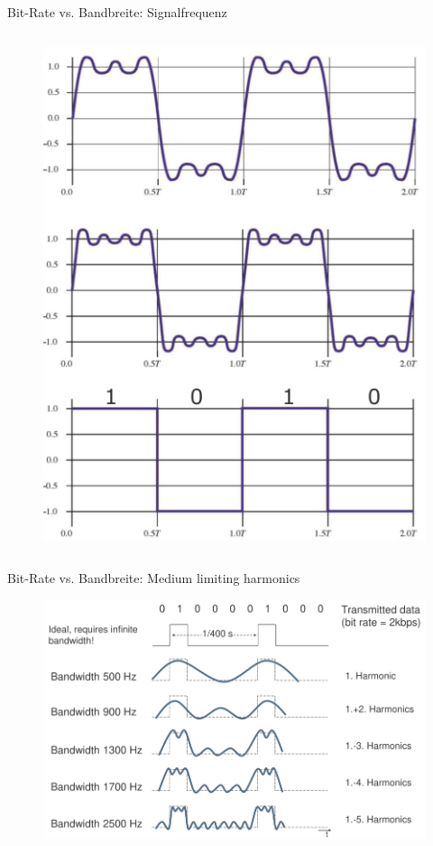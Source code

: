 \documentclass[xcolor=dvipsnames,aspectratio=169]{beamer}
\begin{document}
\begin{frame}{Bit-Rate vs. Bandbreite: Signalfrequenz}
\begin{columns}[T]
\begin{column}{.4\textwidth}
\begin{figure}
\includegraphics[scale=0.25]{sf}
\end{figure}
\end{column}%
\end{columns}
\end{frame}

\begin{frame}{Bit-Rate vs. Bandbreite: Medium limiting harmonics}
\begin{figure}
\includegraphics[scale=0.25]{harmonics}
\end{figure}
\end{frame}
\end{document}
